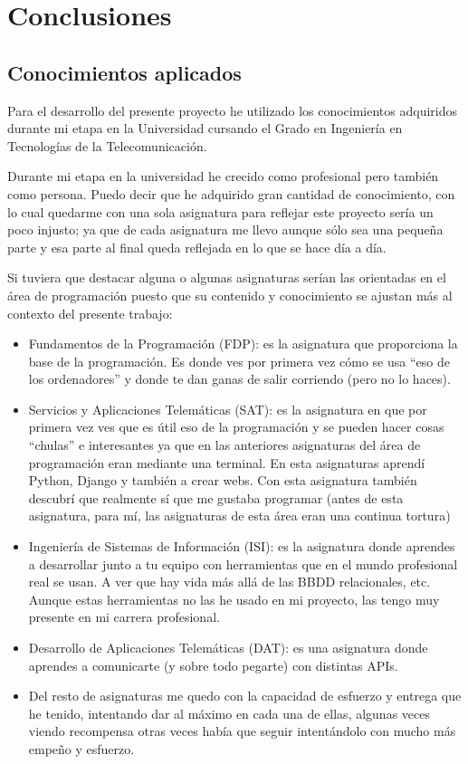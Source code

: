 \cleardoublepage
\chapter{Conclusiones}
\label{chap:conclusiones}


\section{Conocimientos aplicados} 
\label{sec:aplicados}


Para el desarrollo del presente proyecto he utilizado los conocimientos adquiridos durante mi etapa en la Universidad cursando el Grado en Ingeniería en Tecnologías de la Telecomunicación.


Durante mi etapa en la universidad he crecido como profesional pero también como persona. Puedo decir que he adquirido gran cantidad de conocimiento, con lo cual quedarme con una sola asignatura para reflejar este proyecto sería un poco injusto; ya que de cada asignatura me llevo aunque sólo sea una pequeña parte y esa parte al final queda reflejada en lo que se hace día a día.


Si tuviera que destacar alguna o algunas asignaturas serían las orientadas en el área de programación puesto que su contenido y conocimiento se ajustan más al contexto del presente trabajo:



\begin{itemize}
\item Fundamentos de la Programación (FDP): es la asignatura que proporciona la base de la programación. Es donde ves por primera vez cómo se usa “eso de los ordenadores” y donde te dan ganas de salir corriendo (pero no lo haces).
\item Servicios y Aplicaciones Telemáticas (SAT): es la asignatura en que por primera vez ves que es útil eso de la programación y se pueden hacer cosas “chulas” e interesantes ya que en las anteriores asignaturas del área de programación eran mediante una terminal. En esta asignaturas aprendí Python, Django y también a crear webs. Con esta asignatura también descubrí que realmente sí que me gustaba programar (antes de esta asignatura, para mí, las asignaturas de esta área eran una continua tortura)
\item Ingeniería de Sistemas de Información (ISI): es la asignatura donde aprendes a desarrollar junto a tu equipo con herramientas que en el mundo profesional real se usan. A ver que hay vida más allá de las BBDD relacionales, etc. Aunque estas herramientas no las he usado en mi proyecto, las tengo muy presente en mi carrera profesional.
\item Desarrollo de Aplicaciones Telemáticas (DAT): es una asignatura donde aprendes a comunicarte (y sobre todo pegarte) con distintas APIs. 
\item Del resto de asignaturas me quedo con la capacidad de esfuerzo y entrega que he tenido, intentando dar al máximo en cada una de ellas, algunas veces viendo recompensa otras veces había que seguir intentándolo con mucho más empeño y esfuerzo.
\end{itemize}



